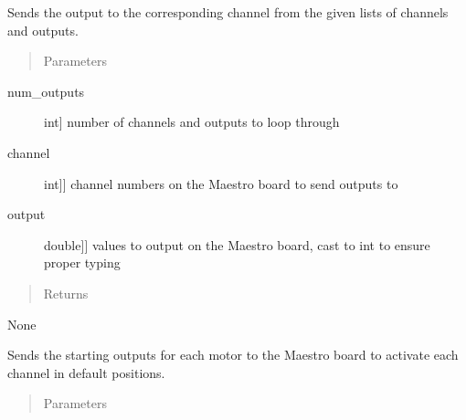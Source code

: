 \documentclass[letterpaper,10pt,english]{sphinxmanual}
\begin{document}
\begin{fulllineitems}
\begin{fulllineitems}
\label{\detokenize{mapping:MovementMap.MovementMap.send_outputs}}
\sphinxAtStartPar
Sends the output to the corresponding channel from the given lists of channels and outputs.
\begin{quote}\begin{description}
\item[{Parameters}] \leavevmode
\end{description}\end{quote}
\begin{description}
\item[{num\_outputs}] \leavevmode{[}int{]}
\sphinxAtStartPar
number of channels and outputs to loop through

\item[{channel}] \leavevmode{[}{[}int{]}{]}
\sphinxAtStartPar
channel numbers on the Maestro board to send outputs to

\item[{output}] \leavevmode{[}{[}double{]}{]}
\sphinxAtStartPar
values to output on the Maestro board, cast to int to ensure proper typing

\end{description}
\begin{quote}\begin{description}
\item[{Returns}] \leavevmode
\end{description}\end{quote}

\sphinxAtStartPar
None

\end{fulllineitems}


\begin{fulllineitems}
\label{\detokenize{mapping:MovementMap.MovementMap.start_outputs}}
\sphinxAtStartPar
Sends the starting outputs for each motor to the Maestro board to activate each channel in default positions.
\begin{quote}\begin{description}
\item[{Parameters}] \leavevmode
\end{description}\end{quote}


\end{fulllineitems}
\end{fulllineitems}
\end{document}
